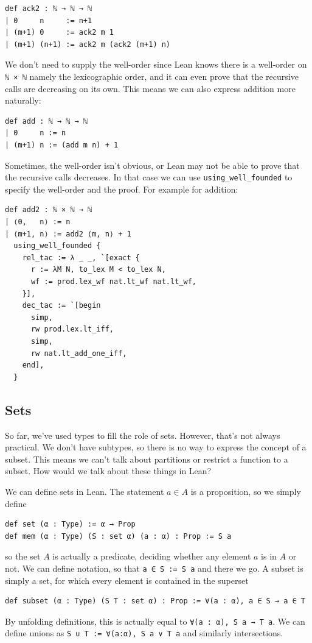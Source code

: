 \documentclass[a4paper, 12pt]{article}
\newcommand{\lean}[1]{\texttt{#1}}
\theoremstyle{changedot}
\theoremstyle{changedotbreak}
\theoremstyle{nonumberplain}
\begin{document}
\begin{verbatim}
def ack2 : ℕ → ℕ → ℕ
| 0     n     := n+1
| (m+1) 0     := ack2 m 1
| (m+1) (n+1) := ack2 m (ack2 (m+1) n)
\end{verbatim}
We don't need to supply the well-order since Lean knows there is a well-order on \lean{ℕ × ℕ} namely the lexicographic order, and it can even prove that the recursive calls are decreasing on its own. This means we can also express addition more naturally:

\begin{verbatim}
def add : ℕ → ℕ → ℕ
| 0     n := n
| (m+1) n := (add m n) + 1
\end{verbatim}

Sometimes, the well-order isn't obvious, or Lean may not be able to prove that the recursive calls decreases. In that case we can use \lean{using_well_founded} to specify the well-order and the proof. For example for addition:

\begin{verbatim}
def add2 : ℕ × ℕ → ℕ
| ⟨0,   n⟩ := n
| ⟨m+1, n⟩ := add2 ⟨m, n⟩ + 1
  using_well_founded {
    rel_tac := λ _ _, `[exact {
      r := λM N, to_lex M < to_lex N,
      wf := prod.lex_wf nat.lt_wf nat.lt_wf,
    }],
    dec_tac := `[begin
      simp,
      rw prod.lex.lt_iff,
      simp,
      rw nat.lt_add_one_iff,
    end],
  }
\end{verbatim}

\subsection{Sets}\label{ssec:sets}
So far, we've used types to fill the role of sets. However, that's not always practical. We don't have subtypes, so there is no way to express the concept of a subset. This means we can't talk about partitions or restrict a function to a subset. How would we talk about these things in Lean?

We can define sets in Lean. The statement $a \in A$ is a proposition, so we simply define
\begin{verbatim}
def set (α : Type) := α → Prop
def mem (α : Type) (S : set α) (a : α) : Prop := S a
\end{verbatim}
so the set $A$ is actually a predicate, deciding whether any element $a$ is in $A$ or not. We can define notation, so that \lean{a ∈ S := S a} and there we go. A subset is simply a set, for which every element is contained in the superset
\begin{verbatim}
def subset (α : Type) (S T : set α) : Prop := ∀(a : α), a ∈ S → a ∈ T
\end{verbatim}
By unfolding definitions, this is actually equal to \lean{∀(a : α), S a → T a}. We can define unions as \lean{S ∪ T := ∀(a:α), S a ∨ T a} and similarly intersections.
\end{document}

